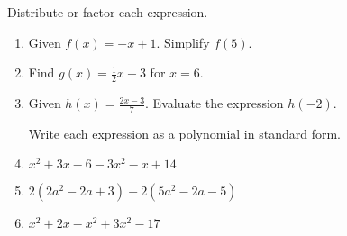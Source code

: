 \documentclass[12pt, oneside]{article}
\begin{document}
Distribute or factor each expression.
\begin{enumerate}
  \subsubsection*{Factoring Fridays}


\newpage
  \item Given $f(x)=-x+1$. Simplify $f(5)$. \vspace{2cm}
  \item Find $g(x)=\frac{1}{2} x-3$ for $x=6$. \vspace{2.5cm}
  \item Given $\displaystyle h(x)=\frac{2x-3}{7}$. Evaluate the expression $h(-2)$. \vspace{4cm}

  Write each expression as a polynomial in standard form.
  \item $x^2+3x -6 -3x^2-x+14$ \vspace{3cm}
  \item $2(2a^2-2a +3) -2(5a^2-2a-5)$ \vspace{3cm}
  \item $x^2+2x-x^2 +3x^2-17$ \vspace{3cm}



\end{enumerate}
\end{document}
